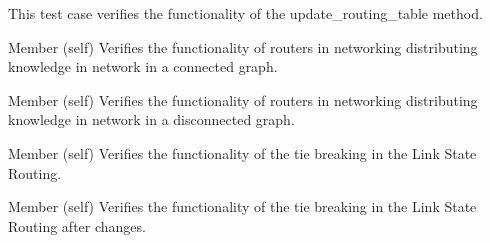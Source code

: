 \begin{DoxyRefList}
%
This test case verifies the functionality of the update\+\_\+routing\+\_\+table method.  
\item[Member \doxylink{classtest__lsr_1_1_test_link_state_acc1029fbd255c96d65f96701131e5a2a}{test\+\_\+lsr.Test\+Link\+State.test\+\_\+distribute\+\_\+all\+\_\+lsp\+\_\+connected\+\_\+graph} (self)]\label{test__test000007}%
%
Verifies the functionality of routers in networking distributing knowledge in network in a connected graph.  
\item[Member \doxylink{classtest__lsr_1_1_test_link_state_acf459bf23da7df09de8cf1b8f5608cd8}{test\+\_\+lsr.Test\+Link\+State.test\+\_\+distribute\+\_\+all\+\_\+lsp\+\_\+disconnected\+\_\+graph} (self)]\label{test__test000008}%
%
Verifies the functionality of routers in networking distributing knowledge in network in a disconnected graph.  
\item[Member \doxylink{classtest__lsr_1_1_test_link_state_ad4c04c827411a720179df65f790399f5}{test\+\_\+lsr.Test\+Link\+State.test\+\_\+tie\+\_\+break} (self)]\label{test__test000009}%
%
Verifies the functionality of the tie breaking in the Link State Routing.  
\item[Member \doxylink{classtest__lsr_1_1_test_link_state_a15bc630780ccb6445a53d1c58b4b6b9c}{test\+\_\+lsr.Test\+Link\+State.test\+\_\+tie\+\_\+break\+\_\+after\+\_\+changes} (self)]\label{test__test000010}%
%
Verifies the functionality of the tie breaking in the Link State Routing after changes. 
\end{DoxyRefList}